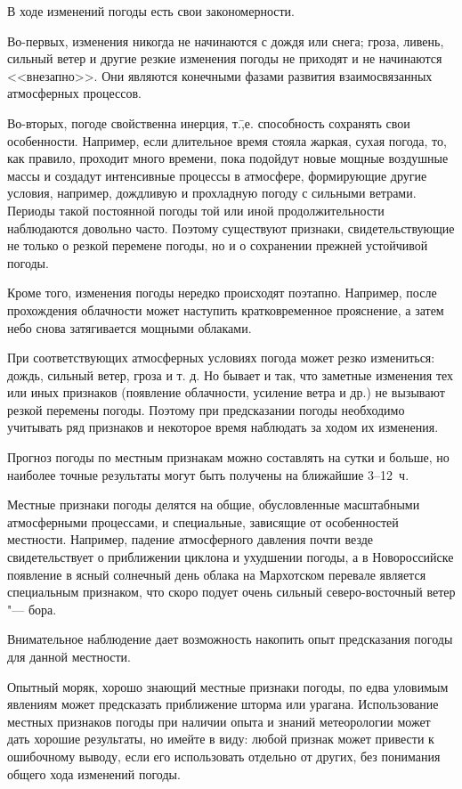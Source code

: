 В ходе изменений погоды есть свои закономерности.

Во-первых, изменения никогда не начинаются с дождя или снега; гроза,
ливень, сильный ветер и другие резкие изменения погоды не приходят и
не начинаются <<внезапно>>. Они являются конечными фазами развития
взаимосвязанных атмосферных процессов.

Во-вторых, погоде свойственна инерция, т.\=,е. способность сохранять
свои особенности. Например, если длительное время стояла жаркая, сухая
погода, то, как правило, проходит много времени, пока подойдут новые
мощные воздушные массы и создадут интенсивные процессы в атмосфере,
формирующие другие условия, например, дождливую и прохладную погоду с
сильными ветрами. Периоды такой постоянной погоды той или иной
продолжительности наблюдаются довольно часто. Поэтому существуют
признаки, свидетельствующие не только о резкой перемене погоды, но и о
сохранении прежней устойчивой погоды.

Кроме того, изменения погоды нередко происходят поэтапно. Например,
после прохождения облачности может наступить кратковременное
прояснение, а затем небо снова затягивается мощными облаками.

При соответствующих атмосферных условиях погода может резко
измениться: дождь, сильный ветер, гроза и т. д. Но бывает и так, что
заметные изменения тех или иных признаков (появление облачности,
усиление ветра и др.) не вызывают резкой перемены погоды. Поэтому при
предсказании погоды необходимо учитывать ряд признаков и некоторое
время наблюдать за ходом их изменения.

Прогноз погоды по местным признакам можно составлять на сутки и
больше, но наиболее точные результаты могут быть получены на ближайшие
3--12~ч.

Местные признаки погоды делятся на общие, обусловленные масштабными
атмосферными процессами, и специальные, зависящие от особенностей
местности. Например, падение атмосферного давления почти везде
свидетельствует о приближении циклона и ухудшении погоды, а в
Новороссийске появление в ясный солнечный день облака на Мархотском
перевале является специальным признаком, что скоро подует очень
сильный северо-восточный ветер "--- бора.

Внимательное наблюдение дает возможность накопить опыт предсказания
погоды для данной местности.

Опытный моряк, хорошо знающий местные признаки погоды, по едва
уловимым явлениям может предсказать приближение шторма или
урагана. Использование местных признаков погоды при наличии опыта и
знаний метеорологии может дать хорошие результаты, но имейте в виду:
любой признак может привести к ошибочному выводу, если его
использовать отдельно от других, без понимания общего хода изменений
погоды.

